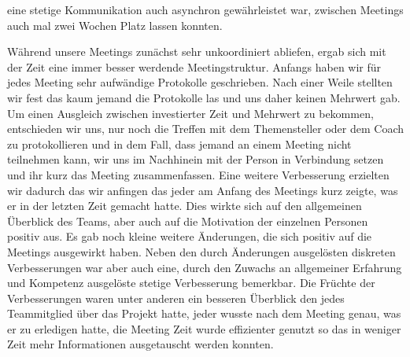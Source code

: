 \documentclass[10pt]{article}
\begin{document}
eine stetige Kommunikation auch asynchron gewährleistet war, zwischen Meetings auch mal zwei Wochen Platz lassen konnten.\par
\medskip
Während unsere Meetings zunächst sehr unkoordiniert abliefen, ergab sich mit der Zeit eine immer besser werdende 
Meetingstruktur. Anfangs haben wir für jedes Meeting sehr aufwändige Protokolle geschrieben. Nach einer Weile stellten 
wir fest das kaum jemand die Protokolle las und uns daher keinen Mehrwert gab. Um einen Ausgleich zwischen 
investierter Zeit und Mehrwert zu bekommen, entschieden wir uns, nur noch die Treffen mit dem Themensteller oder dem Coach
zu protokollieren und in dem Fall, dass jemand an einem Meeting nicht teilnehmen kann, wir uns im Nachhinein mit der 
Person in Verbindung setzen und ihr kurz das Meeting zusammenfassen. Eine weitere Verbesserung erzielten wir dadurch
das wir anfingen das jeder am Anfang des Meetings kurz zeigte, was er in der letzten Zeit gemacht hatte.
Dies wirkte sich auf den allgemeinen Überblick des Teams, aber auch auf die Motivation der einzelnen Personen positiv aus.
Es gab noch kleine weitere Änderungen, die sich positiv auf die Meetings ausgewirkt haben. Neben den 
durch Änderungen ausgelösten diskreten Verbesserungen war aber auch eine, durch den Zuwachs an allgemeiner 
Erfahrung und Kompetenz ausgelöste stetige Verbesserung bemerkbar. Die Früchte der Verbesserungen waren unter anderen 
ein besseren Überblick den jedes Teammitglied über das Projekt hatte, jeder wusste nach dem Meeting genau, was er 
zu erledigen hatte, die Meeting Zeit wurde effizienter genutzt so das in weniger Zeit
mehr Informationen ausgetauscht werden konnten.
\par
\medskip
\end{document}
